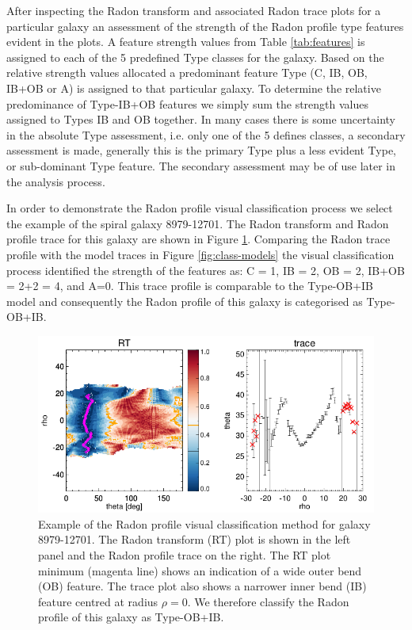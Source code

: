 After inspecting the Radon transform and associated Radon trace plots for a particular galaxy an assessment of the strength of the Radon profile type features evident in the plots. A feature strength values from Table \ref{tab:features} is assigned to each of the 5 predefined Type classes for the galaxy. Based on the relative strength values allocated a predominant feature Type (C, IB, OB, IB+OB or A) is assigned to that particular galaxy. To determine the relative predominance of Type-IB+OB features we simply sum the strength values assigned to Types IB and OB together. 
In many cases there is some uncertainty in the absolute Type assessment, i.e. only one of the 5 defines classes, a secondary assessment is made,  generally this is the primary Type plus a less evident Type, or sub-dominant Type feature. The secondary assessment may be of use later in the analysis process.

In order to demonstrate the Radon profile visual classification process we select the example of the spiral galaxy 8979-12701. The Radon transform and Radon profile trace for this galaxy are shown in Figure \ref{fig:OB+IB}. Comparing the Radon trace profile with the model traces in Figure \ref{fig:class-models} the visual classification process identified the strength of the features as: C = 1, IB = 2, OB = 2, IB+OB = 2+2 = 4, and A=0. This trace profile is comparable to the Type-OB+IB model and consequently the Radon profile of this galaxy is categorised as Type-OB+IB.

\begin{figure}
    \centering
    \includegraphics[width=\columnwidth]{images/RadonPlots/RT-SNIPS-NEW/8979-12701-VA-OB+IB.png}
    \caption{Example of the Radon profile visual classification method for galaxy 8979-12701. The Radon transform (RT) plot is shown in the left panel and the Radon profile trace on the right. The RT plot minimum (magenta line) shows an indication of a wide outer bend (OB) feature. The trace plot also shows a narrower inner bend (IB) feature centred at radius $\rho=0$. We therefore classify the Radon profile of this galaxy as Type-OB+IB.}
    \label{fig:OB+IB}
\end{figure}

